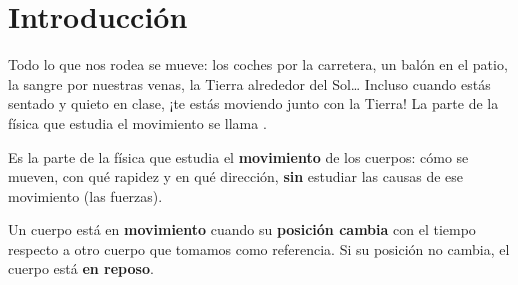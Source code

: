 %
%
%
%

\raggedbottom %

\section{Introducción}

Todo lo que nos rodea se mueve: los coches por la carretera, un balón en el patio, la sangre por nuestras venas, la Tierra alrededor del Sol\ldots{} Incluso cuando estás sentado y quieto en clase, ¡te estás moviendo junto con la Tierra! La parte de la física que estudia el movimiento se llama .

\begin{definition}[Cinemática]
    Es la parte de la física que estudia el \textbf{movimiento} de los cuerpos: cómo se mueven, con qué rapidez y en qué dirección, \textbf{sin} estudiar las causas de ese movimiento (las fuerzas).
\end{definition}

\begin{definition}[Movimiento]
    Un cuerpo está en \textbf{movimiento} cuando su \textbf{posición cambia} con el tiempo respecto a otro cuerpo que tomamos como referencia. Si su posición no cambia, el cuerpo está \textbf{en reposo}.
\end{definition}

